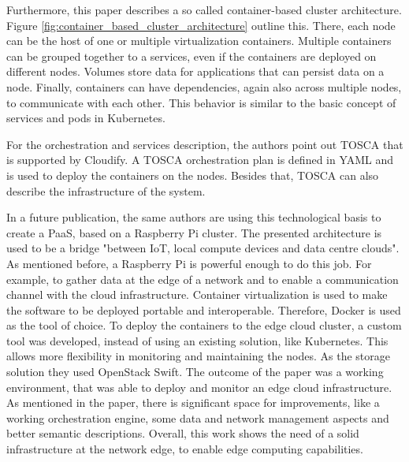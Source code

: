 Furthermore, this paper describes a so called container-based cluster architecture\autocite[p. 384]{Pahl:2015}.
Figure \ref{fig:container_based_cluster_architecture} outline this.
There, each node can be the host of one or multiple virtualization containers.
Multiple containers can be grouped together to a services, even if the containers are deployed on different nodes.\autocite[cf.][p. 384]{Pahl:2015}
Volumes store data for applications that can persist data on a node.\autocite[cf.][p. 384]{Pahl:2015}
Finally, containers can have dependencies, again also across multiple nodes, to communicate with each other.\autocite[cf.][p. 384]{Pahl:2015}
This behavior is similar to the basic concept of services and pods in Kubernetes.

For the orchestration and services description, the authors point out \ac{TOSCA} that is supported by Cloudify.
A \ac{TOSCA} orchestration plan is defined in \ac{YAML} and is used to deploy the containers on the nodes.
Besides that, \ac{TOSCA} can also describe the infrastructure of the system.

In a future publication, the same authors are using this technological basis to create a \ac{PaaS}, based on a Raspberry Pi cluster\autocite{Pahl:2016}.
The presented architecture is used to be a bridge "between IoT, local compute devices and data centre clouds"\autocite[p. 117]{Pahl:2016}.
As mentioned before, a Raspberry Pi is powerful enough to do this job.
For example, to gather data at the edge of a network and to enable a communication channel with the cloud infrastructure.\autocite[cf.][p. 117]{Pahl:2016}
Container virtualization is used to make the software to be deployed portable and interoperable.\autocite[cf.][p. 117]{Pahl:2016}
Therefore, Docker is used as the tool of choice.
To deploy the containers to the edge cloud cluster, a custom tool was developed, instead of using an existing solution, like Kubernetes.\autocite[cf.][p. 122]{Pahl:2016}
This allows more flexibility in monitoring and maintaining the nodes.\autocite[cf.][p. 122]{Pahl:2016}
As the storage solution they used OpenStack Swift.
The outcome of the paper was a working environment, that was able to deploy and monitor an edge cloud infrastructure.
As mentioned in the paper, there is significant space for improvements, like a working orchestration engine, some data and network management aspects and better semantic descriptions.
Overall, this work shows the need of a solid infrastructure at the network edge, to enable edge computing capabilities.

